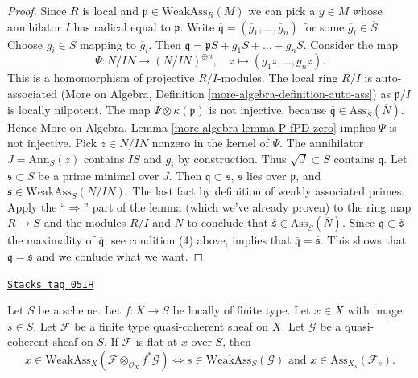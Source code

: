 \begin{proof}
\medskip\noindent
Since $R$ is local and $\mathfrak p \in \text{WeakAss}_R(M)$
we can pick a $y \in M$ whose annihilator $I$ has radical
equal to $\mathfrak p$.
Write $\overline{\mathfrak q} = (\overline{g}_1, \ldots, \overline{g}_n)$
for some $\overline{g}_i \in \overline{S}$. Choose $g_i \in S$
mapping to $\overline{g}_i$.
Then $\mathfrak q = \mathfrak pS + g_1S + \ldots + g_nS$.
Consider the map
$$
\Psi : N/IN \longrightarrow (N/IN)^{\oplus n}, \quad
z \longmapsto (g_1z, \ldots, g_nz).
$$
This is a homomorphism of projective $R/I$-modules.
The local ring $R/I$ is auto-associated
(More on Algebra, Definition \ref{more-algebra-definition-auto-ass})
as $\mathfrak p/I$ is locally nilpotent.
The map $\Psi \otimes \kappa(\mathfrak p)$ is not injective, because
$\overline{\mathfrak q} \in \text{Ass}_{\overline{S}}(\overline{N})$.
Hence More on Algebra, Lemma \ref{more-algebra-lemma-P-fPD-zero}
implies $\Psi$ is not injective. Pick $z \in N/IN$
nonzero in the kernel of $\Psi$. The annihilator $J = \text{Ann}_S(z)$
contains $IS$ and $g_i$ by construction. Thus
$\sqrt{J} \subset S$ contains $\mathfrak q$.
Let $\mathfrak s \subset S$ be a prime minimal over $J$.
Then $\mathfrak q \subset \mathfrak s$,
$\mathfrak s$ lies over $\mathfrak p$, and
$\mathfrak s \in \text{WeakAss}_S(N/IN)$.
The last fact by definition of weakly associated primes.
Apply the ``$\Rightarrow$'' part of the lemma (which we've already proven)
to the ring map $R \to S$ and the modules $R/I$ and $N$
to conclude that
$\overline{\mathfrak s} \in \text{Ass}_{\overline{S}}(\overline{N})$.
Since $\overline{\mathfrak q} \subset \overline{\mathfrak s}$
the maximality of $\overline{\mathfrak q}$, see condition (4) above,
implies that $\overline{\mathfrak q} = \overline{\mathfrak s}$.
This shows that $\mathfrak q = \mathfrak s$ and we conlude
what we want.
\end{proof}

\begin{lemma}
\label{flat-lemma-bourbaki-finite-type-general-base-at-point}
\href{https://stacks.math.columbia.edu/tag/05IH}{\texttt{Stacks tag 05IH}}

Let $S$ be a scheme.
Let $f : X \to S$ be locally of finite type.
Let $x \in X$ with image $s \in S$.
Let $\mathcal{F}$ be a finite type quasi-coherent sheaf on $X$.
Let $\mathcal{G}$ be a quasi-coherent sheaf on $S$.
If $\mathcal{F}$ is flat at $x$ over $S$, then
$$
x \in \text{WeakAss}_X(\mathcal{F} \otimes_{\mathcal{O}_X} f^*\mathcal{G})
\Leftrightarrow
s \in \text{WeakAss}_S(\mathcal{G})
\text{ and }
x \in \text{Ass}_{X_s}(\mathcal{F}_s).
$$
\end{lemma}

